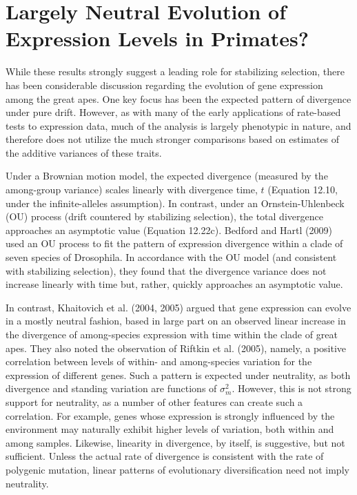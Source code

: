 \documentclass{article}
\begin{document}
\section{Largely Neutral Evolution of Expression Levels in Primates?}
While these results strongly suggest a leading role for stabilizing selection, there has been considerable discussion regarding the evolution of gene expression among the great apes. One key focus has been the expected pattern of divergence under pure drift. However, as with many of the early applications of rate-based tests to expression data, much of the analysis is largely phenotypic in nature, and therefore does not utilize the much stronger comparisons based on estimates of the additive variances of these traits.

Under a Brownian motion model, the expected divergence (measured by the among-group variance) scales linearly with divergence time,  $ t $ (Equation 12.10, under the infinite-alleles assumption). In contrast, under an Ornstein-Uhlenbeck (OU) process (drift countered by stabilizing selection), the total divergence approaches an asymptotic value (Equation 12.22c). Bedford and Hartl (2009) used an OU process to fit the pattern of expression divergence within a clade of seven species of Drosophila. In accordance with the OU model (and consistent with stabilizing selection), they found that the divergence variance does not increase linearly with time but, rather, quickly approaches an asymptotic value.

In contrast, Khaitovich et al. (2004, 2005) argued that gene expression can evolve in a mostly neutral fashion, based in large part on an observed linear increase in the divergence of among-species expression with time within the clade of great apes. They also noted the observation of Riftkin et al. (2005), namely, a positive correlation between levels of within- and among-species variation for the expression of different genes. Such a pattern is expected under neutrality, as both divergence and standing variation are functions of  $ \sigma_{m}^{2} $. However, this is not strong support for neutrality, as a number of other features can create such a correlation. For example, genes whose expression is strongly influenced by the environment may naturally exhibit higher levels of variation, both within and among samples. Likewise, linearity in divergence, by itself, is suggestive, but not sufficient. Unless the actual rate of divergence is consistent with the rate of polygenic mutation, linear patterns of evolutionary diversification need not imply neutrality.
\end{document}
